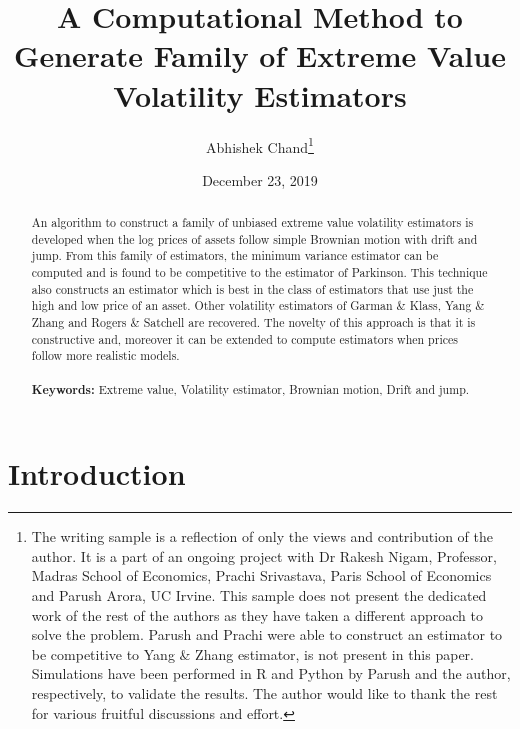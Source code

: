 \documentclass[12pt]{article}   	%
\title{\textbf{A Computational Method to Generate Family of Extreme Value Volatility Estimators}}
\author{ Abhishek Chand\footnote{The writing sample is a reflection of only the views and contribution of the author. It is a part of an ongoing project with Dr Rakesh Nigam, Professor, Madras School of Economics, Prachi Srivastava, Paris School of Economics and Parush Arora, UC Irvine. This sample does not present the dedicated work of the rest of the authors as they have taken a different approach to solve the problem. Parush and Prachi were able to construct an estimator to be competitive to Yang \& Zhang estimator, is not present in this paper. Simulations have been performed in R and Python by Parush and the author, respectively, to validate the results. The author would like to thank the rest for various fruitful discussions and effort.}}
\date{December 23, 2019}
\begin{document}
  

\maketitle
\begin{abstract}
An algorithm to construct a family of unbiased extreme value volatility estimators is developed when the log prices of assets follow 
simple Brownian motion with drift and jump. From this family of estimators, the minimum variance estimator can be computed and 
is found to be competitive to the estimator of Parkinson. This technique also constructs an estimator which is best in the class of estimators that use just the high and low price of an asset. Other volatility estimators of Garman \& Klass, Yang \& Zhang and Rogers \& Satchell are recovered. The novelty of this approach is that it is constructive and, moreover it can be extended to compute estimators when prices follow more realistic models.\\
\\ \textbf{Keywords: }Extreme value, Volatility estimator, Brownian motion, Drift and jump.
\end{abstract}

\renewcommand{\footnoterule}{%
  \kern -3pt
  \hrule width \textwidth height 1pt
  \kern 2pt
}

\newpage
\tableofcontents
\newpage
\section{Introduction}
\label{sec:intro}
\end{document}
